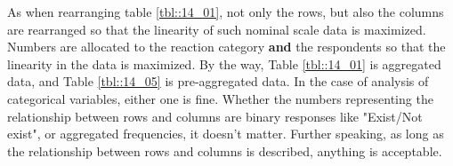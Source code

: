 \documentclass{ltjsbook}
\begin{document}
As when rearranging table \ref{tbl::14_01}, not only the rows, but also the columns are rearranged so that the linearity of such nominal scale data is maximized. Numbers are allocated to the reaction category \textbf{and} the respondents so that the linearity in the data is maximized.
By the way, Table \ref{tbl::14_01} is aggregated data, and Table \ref{tbl::14_05} is pre-aggregated data. In the case of analysis of categorical variables, either one is fine. Whether the numbers representing the relationship between rows and columns are binary responses like "Exist/Not exist", or aggregated frequencies, it doesn't matter. Further speaking, as long as the relationship between rows and columns is described, anything is acceptable.
\end{document}
